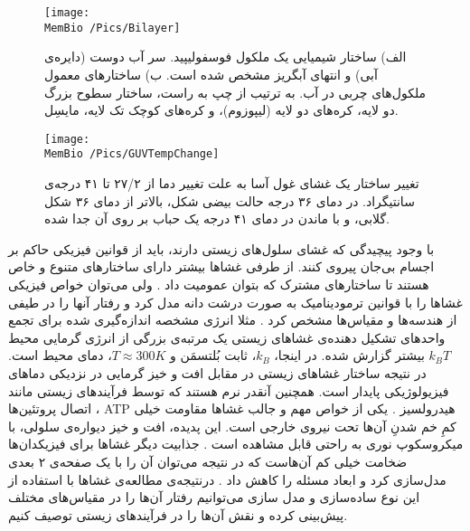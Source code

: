 \begin{figure}[h]
\begin{center}
\texttt{[image: \\MemBio /Pics/Bilayer]}
\caption{
الف) ساختار شیمیایی یک ملکول فوسفولیپید. سر آب دوست (دایره‌ی آبی) و  انتهای آبگریز مشخص شده است. ب) ساختار‌های معمول ملکول‌های چربی در آب. به ترتیب از چپ به راست، ساختار سطوح بزرگ دو لایه، کره‌های دو لایه (لیپوزوم)، و کره‌های کوچک تک لایه، مایسِل.
}
\label{fig:bilayer}
\end{center}
\end{figure}




\begin{figure}[h]
\begin{center}
\texttt{[image: \\MemBio /Pics/GUVTempChange]}
\caption{
تغییر ساختار یک غشای غول ‌آسا به علت تغییر دما از ۲۷/۲ تا ۴۱ درجه‌ی سانتیگراد. در دمای ۳۶ درجه حالت بیضی شکل، بالاتر از دمای ۳۶ شکل گلابی، و با ماندن در دمای ۴۱ درجه یک حباب بر روی آن جدا شده.
}
\label{fig:GUVTempChange}
\end{center}
\end{figure}






با وجود پیچیدگی‌ که غشای سلول‌های زیستی دارند، باید از قوانین فیزیکی حاکم بر اجسام بی‌جان پیروی کنند. از طرفی غشا‌ها بیشتر دارای ساختارهای متنوع و خاص هستند تا ساختارهای مشترک که بتوان عمومیت داد
\cite{NelsonBook2004}.
ولی می‌توان خواص فیزیکی غشاها را با قوانین ترمودینامیک به صورت درشت دانه مدل کرد و رفتار‌ آنها را در طیفی از هندسه‌ها و مقیاس‌ها مشخص کرد
\cite{Seifert1997}
. مثلا انرژی مشخصه اندازه‌گیری شده برای تجمع واحد‌های تشکیل‌ دهنده‌ی غشاهای زیستی یک مرتبه‌ی بزرگی از انرژی گرمایی محیط 
$k_BT$
بیشتر گزارش شده. در اینجا، 
$k_B$،
ثابت بُلتسمَن و 
$T\approx300K$،
دمای محیط است. در نتیجه ساختار غشاهای زیستی در مقابل افت و خیز گرمایی در نزدیکی دماهای فیزیولوژیکی پایدار است. همچنین آنقدر نرم  هستند که توسط فرآیندهای زیستی مانند اتصال پروتئین‌ها
\cite{NelsonBook2004,Seifert1997,Deserno2015}،
ATP
هیدرولسیز
\cite{Boyle2008Biology,Lipowskyb1995ook}.
یکی از خواص مهم و جالب غشاها مقاومت خیلی کمِ خم شدنِ آن‌ها تحت نیروی خارجی است. این پدیده، افت و خیز دیواره‌ی سلولی، با میکروسکوپ نوری به راحتی قابل مشاهده است
\cite{NelsonBook2004}.
جذابیت دیگر غشا‌ها برای فیزیکدان‌ها ضخامت خیلی کم آن‌هاست که در نتیجه می‌توان آن را با یک صفحه‌ی ۲ بعدی مدل‌سازی کرد و ابعاد مسئله‌ را کاهش داد
\cite{Seifert1997,Deserno2015}.
درنتیجه‌ی مطالعه‌ی غشاها با استفاده از این نوع ساده‌سازی و مدل سازی می‌توانیم  رفتار آن‌ها را در مقیاس‌های مختلف پیش‌بینی کرده و نقش‌ آن‌ها را در فرآیند‌های زیستی توصیف کنیم.



